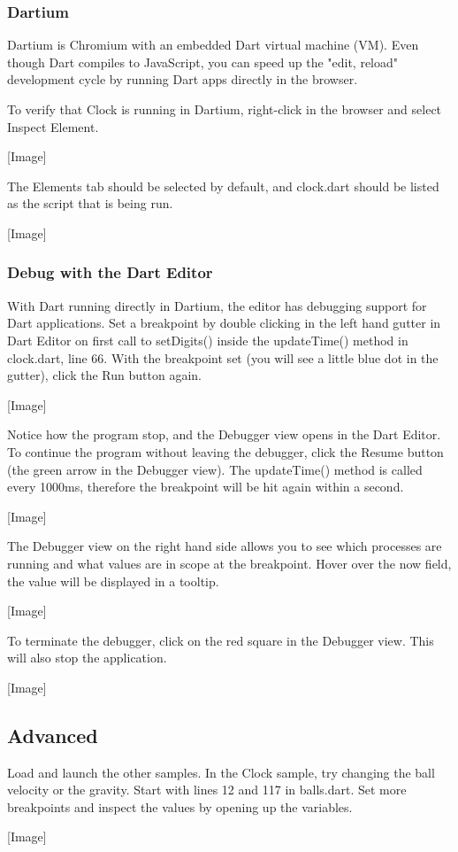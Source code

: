 \subsubsection{Dartium}

Dartium is Chromium with an embedded Dart virtual machine (VM). Even though Dart compiles to JavaScript, you can speed up the "edit, reload" development cycle by running Dart apps directly in the browser.

To verify that Clock is running in Dartium, right-click in the browser and select Inspect Element.

[Image]

The Elements tab should be selected by default, and clock.dart should be listed as the script that is being run.

[Image]

\subsubsection{Debug with the Dart Editor}

With Dart running directly in Dartium, the editor has debugging support for Dart applications. Set a breakpoint by double clicking in the left hand gutter in Dart Editor on first call to setDigits() inside the updateTime() method in clock.dart, line 66. With the breakpoint set (you will see a little blue dot in the gutter), click the Run button again.

[Image]

Notice how the program stop, and the Debugger view opens in the Dart Editor. To continue the program without leaving the debugger, click the Resume button (the green arrow in the Debugger view). The updateTime() method is called every 1000ms, therefore the breakpoint will be hit again within a second.

[Image]

The Debugger view on the right hand side allows you to see which processes are running and what values are in scope at the breakpoint. Hover over the now field, the value will be displayed in a tooltip.

[Image]

To terminate the debugger, click on the red square in the Debugger view. This will also stop the application.

[Image]

\subsection{Advanced}

Load and launch the other samples.
In the Clock sample, try changing the ball velocity or the gravity. Start with lines 12 and 117 in balls.dart.
Set more breakpoints and inspect the values by opening up the variables.

[Image]
